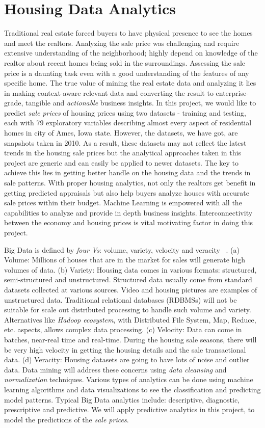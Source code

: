 \documentclass[sigconf]{acmart}
\begin{document}
	\section{Housing Data Analytics}
	
	Traditional real estate forced buyers to have physical presence to see the homes and meet the realtors. Analyzing the sale price was challenging and require extensive understanding of the neighborhood; highly depend on knowledge of the  realtor about recent homes being sold in the surroundings. Assessing the sale price is a daunting task even with a good understanding of the features of any specific home.	The true value of mining the real estate data and analyzing it lies in making context-aware relevant data and converting the result to enterprise-grade, tangible and {\em actionable} business insights. In this project, we would like to predict {\em sale prices} of housing prices using two datasets - training and testing, each with 79 exploratory variables describing almost every aspect of residential homes in city of Ames, Iowa state. However, the datasets, we have got, are snapshots taken in 2010. As a result, these datasets may not reflect the latest trends in the housing sale prices but the analytical approaches taken in this project are generic and can easily be applied to newer datasets. The key to achieve this lies in getting better handle on the housing data and the trends in sale patterns. With proper housing analytics, not only the realtors get benefit in getting predicted appraisals but also help buyers analyze houses with accurate sale prices within their budget. Machine Learning is empowered with all the capabilities to analyze and provide in depth business insights. Interconnectivity between the economy and housing prices is vital motivating factor in doing this project. 
	
	Big Data is defined by {\em four Vs}: volume, variety, velocity and veracity ~\cite{big-data}. (a) Volume: Millions of houses that are in the market for sales will generate high volumes of data. (b) Variety: Housing data comes in various formats: structured, semi-structured and unstructured. Structured data usually come from standard datasets collected at various sources. Video and housing pictures are examples of unstructured data. Traditional relational databases (RDBMSs) will not be suitable for scale out distributed processing to handle such volume and variety. Alternatives like {\em Hadoop ecosystem}, with Distributed File System, Map, Reduce, etc. aspects, allows complex data processing. (c) Velocity: Data can come in batches, near-real time and real-time. During the housing sale seasons, there will be very high velocity in getting the housing details and the sale transactional data. (d) Veracity: Housing datasets are going to have lots of noise and outlier data. Data mining will address these concerns using {\em data cleansing} and {\em normalization} techniques. Various types of analytics can be done using machine learning algorithms and data visualizations to see the classification and predicting model patterns. Typical Big Data analytics include: descriptive, diagnostic, prescriptive and predictive. We will apply predictive analytics in this project, to model the predictions of the {\em sale prices}.
        
\end{document}
